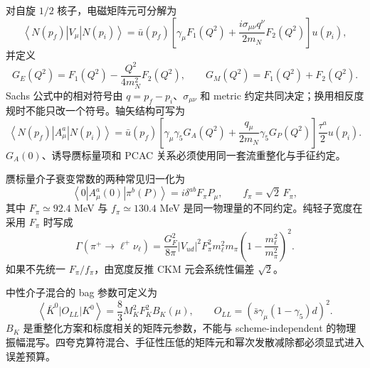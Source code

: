 对自旋 \(1/2\) 核子，电磁矩阵元可分解为
\begin{equation}
  \left\langle N(p_f)|V_\mu|N(p_i)\right\rangle
  =\bar u(p_f)\left[
  \gamma_\mu F_1(Q^2)
  +\frac{i\sigma_{\mu\nu}q^\nu}{2m_N}F_2(Q^2)
  \right]u(p_i),
  \label{eq:b02-nucleon-ff}
\end{equation}
并定义
\begin{equation}
  G_E(Q^2)=F_1(Q^2)-\frac{Q^2}{4m_N^2}F_2(Q^2),
  \qquad
  G_M(Q^2)=F_1(Q^2)+F_2(Q^2).
  \label{eq:b02-sachs}
\end{equation}
Sachs 公式中的相对符号由 \(q=p_f-p_i\)、\(\sigma_{\mu\nu}\) 和 metric 约定共同决定；换用相反度规时不能只改一个符号。轴矢结构可写为
\begin{equation}
  \left\langle N(p_f)|A_\mu^a|N(p_i)\right\rangle
  =\bar u(p_f)\left[
  \gamma_\mu\gamma_5G_A(Q^2)
  +\frac{q_\mu}{2m_N}\gamma_5G_P(Q^2)
  \right]\frac{\tau^a}{2}u(p_i).
  \label{eq:b02-axial-ff}
\end{equation}
\(G_A(0)\)、诱导赝标量项和 PCAC 关系必须使用同一套流重整化与手征约定。

赝标量介子衰变常数的两种常见归一化为
\begin{equation}
  \left\langle0|A_\mu^a(0)|\pi^b(P)\right\rangle
  =i\delta^{ab}F_\pi P_\mu,
  \qquad
  f_\pi=\sqrt2\,F_\pi,
  \label{eq:b02-decay-constant}
\end{equation}
其中 \(F_\pi\simeq92.4\) MeV 与 \(f_\pi\simeq130.4\) MeV 是同一物理量的不同约定。纯轻子宽度在采用 \(F_\pi\) 时写成
\begin{equation}
  \Gamma(\pi^+\to\ell^+\nu_\ell)
  =\frac{G_F^2}{8\pi}|V_{ud}|^2F_\pi^2
  m_\ell^2m_\pi
  \left(1-\frac{m_\ell^2}{m_\pi^2}\right)^2.
  \label{eq:b02-pion-width}
\end{equation}
如果不先统一 \(F_\pi/f_\pi\)，由宽度反推 CKM 元会系统性偏差 \(\sqrt2\)。

中性介子混合的 bag 参数可定义为
\begin{equation}
  \left\langle\bar K^0|O_{LL}|K^0\right\rangle
  =\frac83M_K^2F_K^2B_K(\mu),
  \qquad
  O_{LL}=(\bar s\gamma_\mu(1-\gamma_5)d)^2.
  \label{eq:b02-bk}
\end{equation}
\(B_K\) 是重整化方案和标度相关的矩阵元参数，不能与 scheme-independent 的物理振幅混写。四夸克算符混合、手征性压低的矩阵元和幂次发散减除都必须显式进入误差预算。

